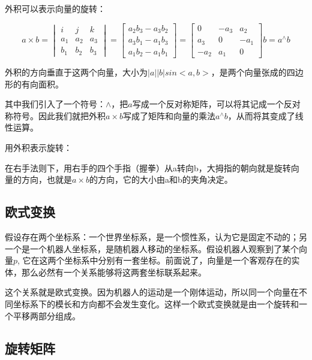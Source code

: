 \documentclass[10pt, oneside]{book}
\begin{document}
外积可以表示向量的旋转：

\begin{equation}
    a \times b 
    = 
    \begin{vmatrix}
        i & j & k\\
        a_1 & a_2 & a_3\\
        b_1 & b_2 & b_3
    \end{vmatrix}
    =
    \begin{bmatrix}
        a_2b_3-a_3b_2\\
        a_3b_1-a_1b_3\\
        a_1b_2-a_1b_1
    \end{bmatrix}
    =
    \begin{bmatrix}
        0 & -a_3 & a_2\\
        a_3 & 0 & -a_1\\
        -a_2 & a_1 & 0
    \end{bmatrix}b
    =
    a^{\wedge}b
\end{equation}

外积的方向垂直于这两个向量，大小为$ |a||b|sin<a,b> $，是两个向量张成的四边形的有向面积。

其中我们引入了一个符号：$\wedge$，把$a$写成一个反对称矩阵，可以将其记成一个反对称符号。因此我们就把外积$a\times b$写成了矩阵和向量的乘法$a^{\wedge}b$，从而将其变成了线性运算。

用外积表示旋转：

在右手法则下，用右手的四个手指（握拳）从a转向b，大拇指的朝向就是旋转向量的方向，也就是$a\times b$的方向，它的大小由a和b的夹角决定。

\subsection{欧式变换}

假设存在两个坐标系：一个世界坐标系，是一个惯性系，认为它是固定不动的；另一个是一个机器人坐标系，是随机器人移动的坐标系。假设机器人观察到了某个向量$p$, 它在这两个坐标系中分别有一套坐标。前面说了，向量是一个客观存在的实体，那么必然有一个关系能够将这两套坐标联系起来。

这个关系就是欧式变换。因为机器人的运动是一个刚体运动，所以同一个向量在不同坐标系下的模长和方向都不会发生变化。这样一个欧式变换就是由一个旋转和一个平移两部分组成。

\subsection{旋转矩阵}
\end{document}
